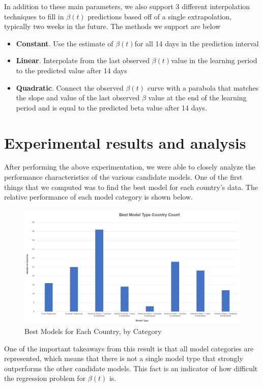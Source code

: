 \documentclass[11pt]{article}
\begin{document}
In addition to these main parameters, we also support 3 different interpolation techniques to fill in $\beta(t)$ predictions based off of a single extrapolation, typically two weeks in the future. The methods we support are below
\begin{itemize}
    \item \textbf{Constant}. Use the estimate of $\beta(t)$for all 14 days in the prediction interval
    \item \textbf{Linear}. Interpolate from the last observed $\beta(t)$value in the learning period to the predicted value after 14 days
    \item \textbf{Quadratic}. Connect the observed $\beta(t)$ curve with a parabola that matches the slope and value of the last observed $\beta$ value at the end of the learning period and is equal to the predicted beta value after 14 days.
\end{itemize}

\section{Experimental results and analysis}
After performing the above experimentation, we were able to closely analyze the performance characteristics of the various candidate models. One of the first things that we computed was to find the best model for each country's data. The relative performance of each model category is shown below.

\begin{figure}[h]
    \includegraphics[width=16cm]{images/CountryCount.png}
    \centering
    \caption{Best Models for Each Country, by Category}
    \label{fig:country-count}
\end{figure}

One of the important takeaways from this result is that all model categories are represented, which means that there is not a single model type that strongly outperforms the other candidate models. This fact is an indicator of how difficult the regression problem for $\beta(t)$ is.
\end{document}
